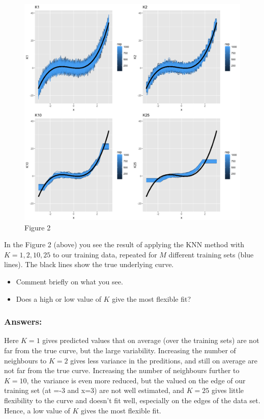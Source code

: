 \documentclass[]{article}
\providecommand{\tightlist}{%
  \setlength{\itemsep}{0pt}\setlength{\parskip}{0pt}}
\begin{document}
\begin{figure}
\centering
\includegraphics{Prob1f2.png}
\caption{Figure 2}
\end{figure}

In the Figure 2 (above) you see the result of applying the KNN method
with \(K=1,2,10,25\) to our training data, repeated for \(M\) different
training sets (blue lines). The black lines show the true underlying
curve.

\begin{itemize}
\tightlist
\item
  Comment briefly on what you see.
\item
  Does a high or low value of \(K\) give the most flexible fit?
\end{itemize}

\subsubsection{Answers:}\label{answers}

{Here \(K=1\) gives predicted values that on average (over the training
sets) are not far from the true curve, but the large variability.
Increasing the number of neighbours to \(K=2\) gives less variance in
the preditions, and still on average are not far from the true curve.
Increasing the number of neighbours further to \(K=10\), the variance is
even more reduced, but the valued on the edge of our training set (at
=-3 and x=3) are not well estimated, and \(K=25\) gives little
flexibility to the curve and doesn't fit well, especially on the edges
of the data set. Hence, a low value of \(K\) gives the most flexible
fit.}
\end{document}
